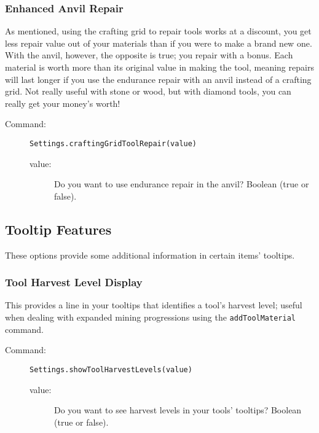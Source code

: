\documentclass[letterpaper,titlepage,12pt]{article}
\begin{document}
\begin{description}
\subsubsection{Enhanced Anvil Repair}

As mentioned, using the crafting grid to repair tools works at a discount, you get less repair value out of your materials than if you were to make a brand new one.  With the anvil, however, the opposite is true; you repair with a bonus.  Each material is worth more than its original value in making the tool, meaning repairs will last longer if you use the endurance repair with an anvil instead of a crafting grid.  Not really useful with stone or wood, but with diamond tools, you can really get your money's worth!

\begin{description}
\item[Command:] \texttt{Settings.craftingGridToolRepair(value)}
\begin{description}
\item [value:] Do you want to use endurance repair in the anvil?  Boolean (true or false).
\end{description}
\end{description}

\subsection{Tooltip Features}

These options provide some additional information in certain items' tooltips.

\subsubsection{Tool Harvest Level Display}

This provides a line in your tooltips that identifies a tool's harvest level; useful when dealing with expanded mining progressions using the \texttt{addToolMaterial} command.

\begin{description}
\item[Command:] \texttt{Settings.showToolHarvestLevels(value)}
\begin{description}
\item [value:] Do you want to see harvest levels in your tools' tooltips?  Boolean (true or false).
\end{description}
\end{description}


\end{description}
\end{document}
